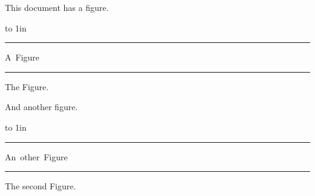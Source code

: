 \documentclass[10pt]{article}
\begin{document}

This document has a figure.

\topinsert
  \vbox to 1in {\hrule
    \vfill
    \hbox{A Figure}
    \vfill
    \hrule}
  \caption{The Figure.}
\endinsert

And another figure.

\topinsert
  \vbox to 1in {\hrule
    \vfill
    \hbox{An other Figure}
    \vfill
    \hrule}
  \caption{The second Figure.}
\endinsert

\vfill
\end{document}

